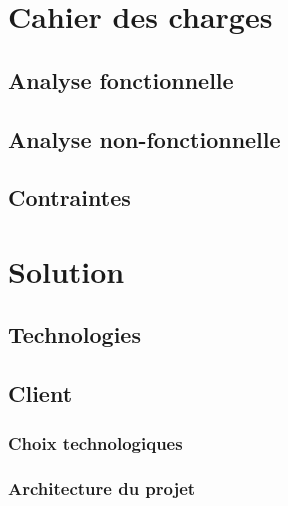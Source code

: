 \chapter{Cahier des charges}

\section{Analyse fonctionnelle}

\section{Analyse non-fonctionnelle}

\section {Contraintes}


\chapter{Solution}

\section{Technologies}

\section{Client}
\subsection{Choix technologiques}
\subsection{Architecture du projet}

